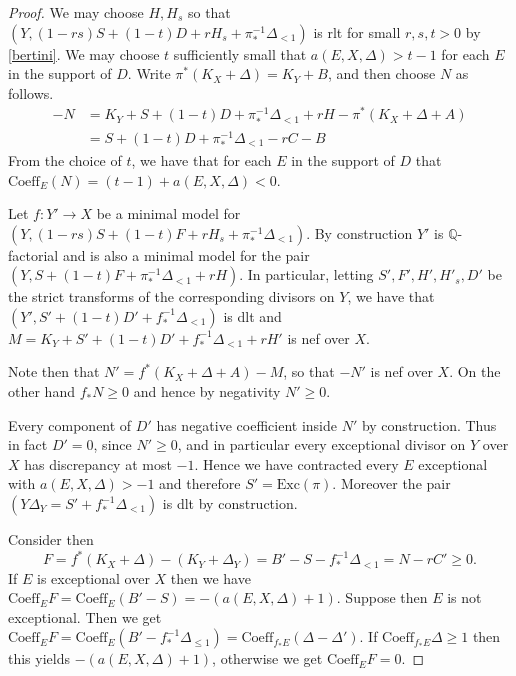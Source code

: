 \begin{proof}
	We may choose $H,H_{s}$ so that $(Y, (1-rs)S+(1-t)D+rH_{s}+\pi_{*}^{-1}\Delta_{<1})$ is rlt for small $r,s,t > 0$ by \autoref{bertini}. We may choose $t$ sufficiently small that $a(E,X,\Delta) > t-1$ for each $E$ in the support of $D$. Write $\pi^{*}(K_{X}+\Delta)=K_{Y}+B$, and then choose $N$ as follows.
	\begin{align*}
	-N&=K_{Y}+S+(1-t)D+\pi_{*}^{-1}\Delta_{<1}+rH-\pi^{*}(K_{X}+\Delta+A)\\
	&=S+(1-t)D+\pi_{*}^{-1}\Delta_{<1}-rC-B
	\end{align*}
	From the choice of $t$, we have that for each $E$ in the support of $D$ that $\text{Coeff}_{E}(N)=(t-1)+a(E,X,\Delta) < 0$.
	
	Let $f:Y' \to X$ be a minimal model for $(Y, (1-rs)S+(1-t)F+rH_{s}+\pi_{*}^{-1}\Delta_{<1})$. By construction $Y'$ is $\mathbb{Q}$-factorial and is also a minimal model for the pair $(Y,S+(1-t)F+\pi_{*}^{-1}\Delta_{<1}+rH)$. In particular, letting $S',F',H', H'_{s},D'$ be the strict transforms of the corresponding divisors on $Y$, we have that $(Y',S'+(1-t)D'+f_{*}^{-1}\Delta_{<1})$ is dlt and $M=K_{Y}+S'+(1-t)D'+f_{*}^{-1}\Delta_{<1}+rH'$ is nef over $X$.
	
	Note then that $N'=f^{*}(K_{X}+\Delta+A)-M$, so that $-N'$ is nef over $X$. On the other hand $f_{*}N \geq 0$ and hence by negativity $N' \geq 0$. 
	
 	Every component of $D'$ has negative coefficient inside $N'$ by construction. Thus in fact $D'=0$, since $N' \geq 0$, and in particular every exceptional divisor on $Y$ over $X$ has discrepancy at most $-1$. Hence we have contracted every $E$ exceptional with $a(E,X,\Delta) >-1$ and therefore $S'=\text{Exc}(\pi)$. Moreover the pair $(Y\Delta_{Y}=S'+f_{*}^{-1}\Delta_{<1})$ is dlt by construction. 
 	
 	Consider then $$F=f^{*}(K_{X}+\Delta)-(K_{Y}+\Delta_{Y})=B'-S-f_{*}^{-1}\Delta_{<1}=N-rC' \geq 0.$$ If $E$ is exceptional over $X$ then we have $\text{Coeff}_{E}F=\text{Coeff}_{E}(B'-S)=-(a(E,X,\Delta)+1)$. Suppose then $E$ is not exceptional. Then we get $\text{Coeff}_{E}F=\text{Coeff}_{E}(B'-f_{*}^{-1}\Delta_{\leq1})=\text{Coeff}_{f_{*}E}(\Delta-\Delta')$. If $\text{Coeff}_{f_{*}E}\Delta \geq 1$ then this yields $-(a(E,X,\Delta)+1)$, otherwise we get $\text{Coeff}_{E}F=0$.

 	
%
% 	
	

\end{proof}
